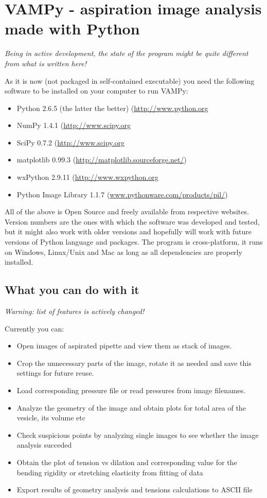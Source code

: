 \section{VAMPy - aspiration image analysis made with Python}\label{vampy}
\emph{Being in active development, the state of the program might be quite different from what is written here!}

As it is now (not packaged in self-contained executable) you need the following software to be installed on your computer to run VAMPy:
\begin{itemize}
	\item Python 2.6.5 (the latter the better) (\url{http://www.python.org}
	\item NumPy 1.4.1 (\url{http://www.scipy.org}
	\item SciPy 0.7.2 (\url{http://www.scipy.org}
	\item matplotlib 0.99.3 (\url{http://matplotlib.sourceforge.net/})
	\item wxPython 2.9.11 (\url{http://www.wxpython.org}
	\item Python Image Library 1.1.7 (\url{www.pythonware.com/products/pil/}) 
\end{itemize}
All of the above is Open Source and freely available from respective websites. Version numbers are the ones with which the software was developed and tested, but it might also work with older versions and hopefully will work with future versions of Python language and packages. The program is cross-platform, it runs on Windows, Linux/Unix and Mac as long as all dependencies are properly installed.

\subsection{What you can do with it}\label{vampy-features}
\emph{Warning: list of features is actively changed!}

Currently you can:
\begin{itemize}
	\item Open images of aspirated pipette and view them as stack of images.
	\item Crop the unnecessary parts of the image, rotate it as needed and save this settings for future reuse.
	\item Load corresponding pressure file or read pressures from image filenames.
	\item Analyze the geometry of the image and obtain plots for total area of the vesicle, its volume etc
	\item Check suspicious points by analyzing single images to see whether the image analysis succeded
	\item Obtain the plot of tension vs dilation and corresponding value for the bending rigidity or stretching elasticity from fitting of data
	\item Export results of geometry analysis and tensions calculations to ASCII file
\end{itemize}

